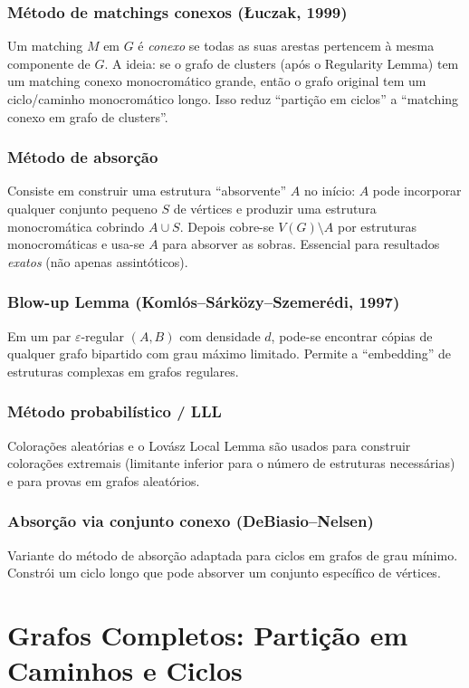 \documentclass[12pt,a4paper,twoside,openright]{book}
\theoremstyle{definition}
\begin{document}
\subsection*{Método de matchings conexos (Łuczak, 1999)}
Um matching $M$ em $G$ é \emph{conexo} se todas as suas arestas pertencem à mesma componente de $G$.
A ideia: se o grafo de clusters (após o Regularity Lemma) tem um matching conexo monocromático grande,
então o grafo original tem um ciclo/caminho monocromático longo.
Isso reduz ``partição em ciclos'' a ``matching conexo em grafo de clusters''.

\subsection*{Método de absorção}
Consiste em construir uma estrutura ``absorvente'' $A$ no início:
$A$ pode incorporar qualquer conjunto pequeno $S$ de vértices e produzir uma estrutura monocromática
cobrindo $A \cup S$.
Depois cobre-se $V(G) \setminus A$ por estruturas monocromáticas e usa-se $A$ para absorver as sobras.
Essencial para resultados \emph{exatos} (não apenas assintóticos).

\subsection*{Blow-up Lemma (Komlós--Sárközy--Szemerédi, 1997)}
Em um par $\varepsilon$-regular $(A,B)$ com densidade $d$, pode-se encontrar cópias de qualquer grafo
bipartido com grau máximo limitado. Permite a ``embedding'' de estruturas complexas em grafos regulares.

\subsection*{Método probabilístico / LLL}
Colorações aleatórias e o Lovász Local Lemma são usados para construir colorações extremais
(limitante inferior para o número de estruturas necessárias) e para provas em grafos aleatórios.

\subsection*{Absorção via conjunto conexo (DeBiasio--Nelsen)}
Variante do método de absorção adaptada para ciclos em grafos de grau mínimo.
Constrói um ciclo longo que pode absorver um conjunto específico de vértices.


\chapter{Grafos Completos: Partição em Caminhos e Ciclos}
\end{document}
